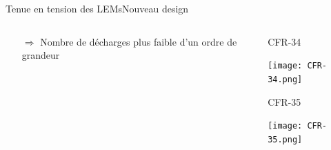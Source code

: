 \begin{frame}{Tenue en tension des LEMs}{Nouveau design}
\begin{columns}
\begin{column}{0.5\textwidth}
\begin{scriptsize}
\begin{itemize}
	    				\item[$\Rightarrow$] Nombre de décharges plus faible d'un ordre de grandeur
	    			\end{itemize}
	    		\end{scriptsize}
    		\end{column}\hfill
    		\begin{column}{0.5\textwidth}
    			\begin{minipage}{0.48\textwidth}
    				\centering
    				\begin{scriptsize}
	    				CFR-34
	    			\end{scriptsize}
    				\texttt{[image: CFR-34.png]}
    			\end{minipage}\hfill
    			\begin{minipage}{0.48\textwidth}
    				\centering
    				\begin{scriptsize}
	    				CFR-35
    				\end{scriptsize}
    				\texttt{[image: CFR-35.png]}
    			\end{minipage}
    		\end{column}
    	\end{columns}
    \end{frame}

